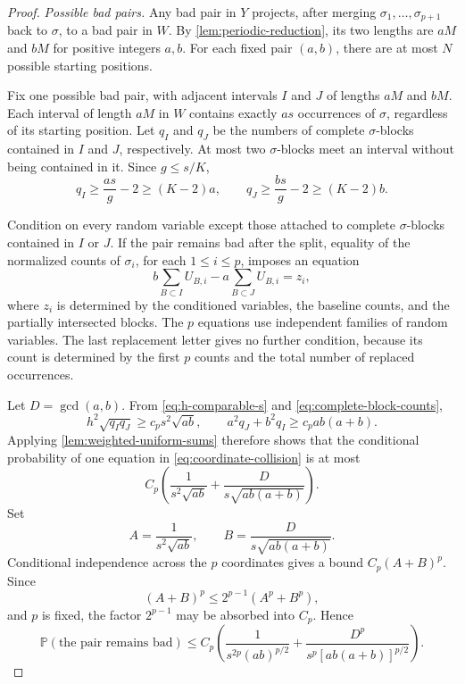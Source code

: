 \documentclass[11pt]{article}
\theoremstyle{plain}
\theoremstyle{definition}
\theoremstyle{remark}
\newcommand{\Prob}{\mathbb P}
\begin{document}
\begin{proof}
\emph{Possible bad pairs.}
Any bad pair in \(Y\) projects, after merging \(\sigma_1,\ldots,\sigma_{p+1}\) back to \(\sigma\), to a bad pair in \(W\). By \cref{lem:periodic-reduction}, its two lengths are \(aM\) and \(bM\) for positive integers \(a,b\). For each fixed pair \((a,b)\), there are at most \(N\) possible starting positions.

Fix one possible bad pair, with adjacent intervals \(I\) and \(J\) of lengths \(aM\) and \(bM\). Each interval of length \(aM\) in \(W\) contains exactly \(as\) occurrences of \(\sigma\), regardless of its starting position. Let \(q_I\) and \(q_J\) be the numbers of complete \(\sigma\)-blocks contained in \(I\) and \(J\), respectively. At most two \(\sigma\)-blocks meet an interval without being contained in it. Since \(g\le s/K\),
\begin{equation}\label{eq:complete-block-counts}
        q_I\ge \frac{as}{g}-2\ge (K-2)a,
        \qquad
        q_J\ge \frac{bs}{g}-2\ge (K-2)b.
\end{equation}

Condition on every random variable except those attached to complete \(\sigma\)-blocks contained in \(I\) or \(J\). If the pair remains bad after the split, equality of the normalized counts of \(\sigma_i\), for each \(1\le i\le p\), imposes an equation
\begin{equation}\label{eq:coordinate-collision}
        b\sum_{B\subset I}U_{B,i}
        -a\sum_{B\subset J}U_{B,i}
        =z_i,
\end{equation}
where \(z_i\) is determined by the conditioned variables, the baseline counts, and the partially intersected blocks. The \(p\) equations use independent families of random variables. The last replacement letter gives no further condition, because its count is determined by the first \(p\) counts and the total number of replaced occurrences.

Let \(D=\gcd(a,b)\). From \eqref{eq:h-comparable-s} and \eqref{eq:complete-block-counts},
\[
 h^2\sqrt{q_Iq_J}\ge c_ps^2\sqrt{ab},
 \qquad
 a^2q_J+b^2q_I\ge c_pab(a+b).
\]
Applying \cref{lem:weighted-uniform-sums} therefore shows that the conditional probability of one equation in \eqref{eq:coordinate-collision} is at most
\begin{equation}\label{eq:one-coordinate-survival}
        C_p\left(
        \frac{1}{s^2\sqrt{ab}}
        +\frac{D}{s\sqrt{ab(a+b)}}
        \right).
\end{equation}
Set
\[
 A=\frac{1}{s^2\sqrt{ab}},
 \qquad
 B=\frac{D}{s\sqrt{ab(a+b)}}.
\]
Conditional independence across the \(p\) coordinates gives a bound \(C_p(A+B)^p\). Since
\[
        (A+B)^p\le 2^{p-1}(A^p+B^p),
\]
and \(p\) is fixed, the factor \(2^{p-1}\) may be absorbed into \(C_p\). Hence
\begin{equation}\label{eq:candidate-survival}
 \Prob(\text{the pair remains bad})
 \le C_p\left(
        \frac{1}{s^{2p}(ab)^{p/2}}
        +\frac{D^p}{s^p[ab(a+b)]^{p/2}}
 \right).
\end{equation}


\end{proof}
\end{document}
